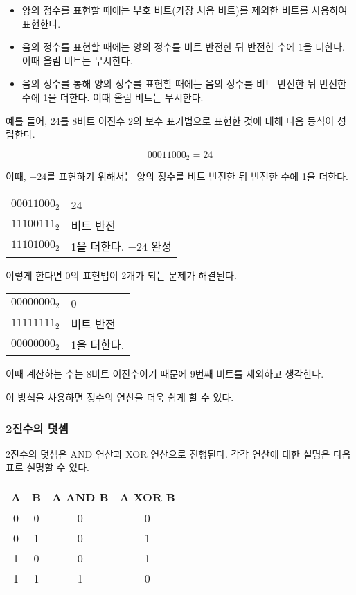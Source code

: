 \documentclass{article}
\begin{document}
\begin{itemize}
    \item 양의 정수를 표현할 때에는 부호 비트(가장 처음 비트)를 제외한 비트를 사용하여 표현한다.
    \item 음의 정수를 표현할 때에는 양의 정수를 비트 반전한 뒤 반전한 수에 1을 더한다. 이때 올림 비트는 무시한다.
    \item 음의 정수를 통해 양의 정수를 표현할 때에는 음의 정수를 비트 반전한 뒤 반전한 수에 1을 더한다. 이때 올림 비트는 무시한다.
\end{itemize}

예를 들어, $24$를 8비트 이진수 2의 보수 표기법으로 표현한 것에 대해 다음 등식이 성립한다.

$$
00011000_2 = 24
$$

이때, $-24$를 표현하기 위해서는 양의 정수를 비트 반전한 뒤 반전한 수에 1을 더한다.

\begin{center}
    \begin{tabular}{rl}
        $00011000_2$ & 24 \\
        $11100111_2$ & 비트 반전 \\
        $11101000_2$ & 1을 더한다. $-24$ 완성
    \end{tabular}
\end{center}

이렇게 한다면 0의 표현법이 2개가 되는 문제가 해결된다.

\begin{center}
    \begin{tabular}{rl}
        $00000000_2$ & 0 \\
        $11111111_2$ & 비트 반전 \\
        $00000000_2$ & 1을 더한다.
    \end{tabular}
\end{center}

이때 계산하는 수는 8비트 이진수이기 때문에 9번째 비트를 제외하고 생각한다.

이 방식을 사용하면 정수의 연산을 더욱 쉽게 할 수 있다.

\subsubsection{2진수의 덧셈}

2진수의 덧셈은 AND 연산과 XOR 연산으로 진행된다. 각각 연산에 대한 설명은 다음 표로 설명할
수 있다.

\begin{center}
    \begin{tabular}{cc|cc}
        A & B & A AND B & A XOR B \\
        \hline
        0 & 0 & 0 & 0 \\
        0 & 1 & 0 & 1 \\
        1 & 0 & 0 & 1 \\
        1 & 1 & 1 & 0
    \end{tabular}
\end{center}
\end{document}
